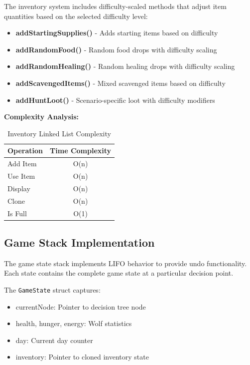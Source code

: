 \documentclass[12pt,a4paper]{article}
\begin{document}
The inventory system includes difficulty-scaled methods that adjust item quantities based on the selected difficulty level:
\begin{itemize}
	\item \textbf{addStartingSupplies()} - Adds starting items based on difficulty
	\item \textbf{addRandomFood()} - Random food drops with difficulty scaling
	\item \textbf{addRandomHealing()} - Random healing drops with difficulty scaling
	\item \textbf{addScavengedItems()} - Mixed scavenged items based on difficulty
	\item \textbf{addHuntLoot()} - Scenario-specific loot with difficulty modifiers
\end{itemize}

\textbf{Complexity Analysis:}
\begin{table}[h]
	\centering
	\caption{Inventory Linked List Complexity}
	\begin{tabular}{@{}lc@{}}
		\toprule
		\textbf{Operation} & \textbf{Time Complexity} \\ \midrule
		Add Item           & O(n)                     \\
		Use Item           & O(n)                     \\
		Display            & O(n)                     \\
		Clone              & O(n)                     \\
		Is Full            & O(1)                     \\
		\bottomrule
	\end{tabular}
\end{table}

\subsection{Game Stack Implementation}
The game state stack implements LIFO behavior to provide undo functionality. Each state contains the complete game state at a particular decision point.

The \texttt{GameState} struct captures:
\begin{itemize}
	\item currentNode: Pointer to decision tree node
	\item health, hunger, energy: Wolf statistics
	\item day: Current day counter
	\item inventory: Pointer to cloned inventory state
\end{itemize}
\end{document}
